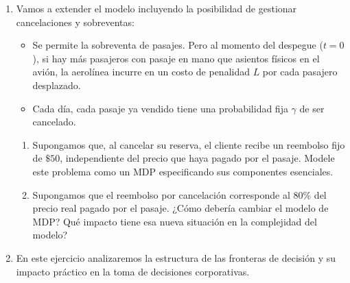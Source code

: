 \documentclass[12pt]{article}
\begin{document}
\begin{enumerate}
\begin{enumerate}
\item ¿Cómo espera que varíe la proporción $p_t$ a medida que se acerca la fecha del vuelo ($t \to 0$)? Justifique su razonamiento.
\item Especifique el modelo de MDP de horizonte finito bajo estas nuevas condiciones y escriba la ecuación de Bellman correspondiente.
\item Asumiendo que la dinámica temporal de la demanda sigue la curva $p_t = 1 - e^{-t/30}$:
\begin{itemize}
\item Modifique el código en Python para incorporar esta estructura de clientes variables en el tiempo.
\item Grafique la nueva política óptma y compárela con la del punto 1. ¿Logra esta extensión replicar cualitativamente el fenómeno observado en los datos reales del pasaje de EE.UU.? Desarrolle.
\end{itemize}
\end{enumerate}

\newpage
\item Vamos a extender el modelo incluyendo la posibilidad de gestionar cancelaciones y sobreventas:
\begin{itemize}
\item Se permite la sobreventa de pasajes. Pero al momento del despegue ($t=0$), si hay más pasajeros con pasaje en mano que asientos físicos en el avión, la aerolínea incurre en un costo de penalidad $L$ por cada pasajero desplazado.
\item Cada día, cada pasaje ya vendido tiene una probabilidad fija $\gamma$ de ser cancelado.
\end{itemize}
\begin{enumerate}
    \item Supongamos que, al cancelar su reserva, el cliente recibe un reembolso fijo de $\$50$, independiente del precio que haya pagado por el pasaje. Modele este problema como un MDP especificando sus componentes esenciales.
    
    \item Supongamos que el reembolso por cancelación corresponde al 80\% del precio real pagado por el pasaje. ¿Cómo debería cambiar el modelo de MDP? \textquestiondown Qu\'e impacto tiene esa nueva situaci\'on en la complejidad del modelo?
\end{enumerate}

\item En este ejercicio analizaremos la estructura de las fronteras de decisión y su impacto práctico en la toma de decisiones corporativas.


\end{enumerate}
\end{document}
